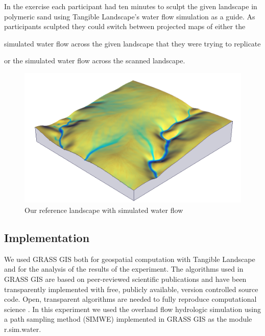 \documentclass{isprs}
\begin{document}
In the  exercise each participant had ten minutes to  
sculpt the given landscape in polymeric sand
using Tangible Landscape's water flow simulation
as a guide. 
%
As participants sculpted they could switch between projected maps of either the
\begin{enumerate*}[label=\alph*),font=\itshape]
\item simulated water flow across the given landscape that they were trying to replicate
\item or the simulated water flow across the scanned landscape.
\end{enumerate*}

\begin{figure}[ht!]
\begin{center}
\includegraphics[width=1.0\columnwidth]{figures/depth.png}
\caption{Our reference landscape with simulated water flow}
\label{fig:study_area}
\end{center}
\end{figure}

\subsection{Implementation}
We used GRASS GIS both
for geospatial computation with Tangible Landscape
and for the analysis of the results of the experiment.
The algorithms used in GRASS GIS are 
based on peer-reviewed scientific publications 
and have been 
transparently implemented 
with free, publicly available, version controlled source code. 
Open, transparent algorithms are needed to fully reproduce computational science \cite{Rocchini2012}. 
In this experiment we used
the overland flow hydrologic simulation using a path sampling method (SIMWE) 
implemented in GRASS GIS as the module r.sim.water.
\end{document}
